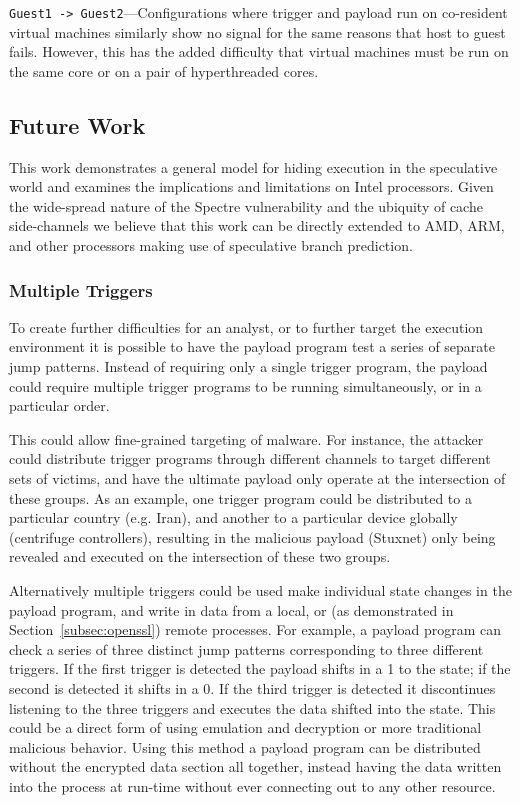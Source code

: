 \texttt{Guest1 -> Guest2}---Configurations where trigger and payload run on
co-resident virtual machines similarly show no signal for the same reasons that
host to guest \speculake fails. However, this has the added difficulty that
virtual machines must be run on the same core or on a pair of hyperthreaded
cores.




\subsection{Future Work}
\label{subsec:future-work}

This work demonstrates a general model for hiding execution in 
the speculative world and examines the implications and limitations on 
Intel processors. Given the wide-spread nature of the Spectre vulnerability 
and the ubiquity of cache side-channels we believe that this work can 
be directly extended to AMD, ARM, and other processors making use of
speculative branch prediction.

\subsubsection{Multiple Triggers}
To create further difficulties for an analyst, or to further target the
execution environment it is possible to have the payload program test a series
of separate jump patterns. Instead of requiring only a single trigger program,
the payload could require multiple trigger programs to be running
simultaneously, or in a particular order.

This could allow fine-grained targeting of malware. For instance, the attacker
could distribute trigger programs through different channels to target different sets
of victims, and have the ultimate payload only operate at the intersection of
these groups. As an example, one trigger program could be distributed to a
particular country (e.g. Iran), and another to a particular device globally
(centrifuge controllers), resulting in the malicious payload (Stuxnet) only
being revealed and executed on the intersection of these two groups.


\smallskip

Alternatively multiple triggers could be used make individual state changes in
the payload program, and write in data from a local, or (as demonstrated in
Section~\ref{subsec:openssl}) remote processes. For example, a payload program
can check a series of three distinct jump patterns corresponding to three
different triggers. If the first trigger is detected the payload shifts in a 1
to the state; if the second is detected it shifts in a 0. If the third trigger
is detected it discontinues listening to the three triggers and executes the
data shifted into the state.
This could be a direct form of \speculake using emulation and
decryption or more traditional malicious behavior. Using this method a payload
program can be distributed without the encrypted data section all together,
instead having the data written into the process at run-time without ever
connecting out to any other resource.

